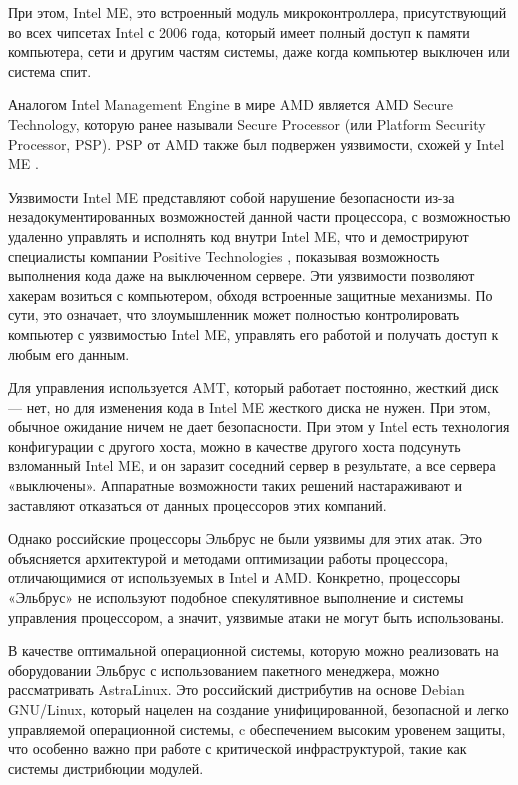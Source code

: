 При этом, Intel ME, это встроенный модуль микроконтроллера, присутствующий во всех чипсетах Intel с 2006 года, который имеет полный доступ к памяти компьютера, сети и другим частям системы, даже когда компьютер выключен или система спит.

Аналогом Intel Management Engine в мире AMD является AMD Secure Technology, которую ранее называли Secure Processor (или Platform Security Processor, PSP). PSP от AMD также был подвержен уязвимости, схожей у Intel ME \cite{risk:amdpsp}.

Уязвимости Intel ME представляют собой нарушение безопасности из-за незадокументированных возможностей данной части процессора, с возможностью удаленно управлять и исполнять код внутри Intel ME, что и демострируют специалисты компании Positive Technologies \cite{risk:intelme}, показывая возможность выполнения кода даже на выключенном сервере. Эти уязвимости позволяют хакерам возиться с компьютером, обходя встроенные защитные механизмы. По сути, это означает, что злоумышленник может полностью контролировать компьютер с уязвимостью Intel ME, управлять его работой и получать доступ к любым его данным.

Для управления используется AMT, который работает постоянно, жесткий диск — нет, но для изменения кода в  Intel ME жесткого диска не нужен. При этом, обычное ожидание ничем не дает безопасности. При этом у Intel есть технология конфигурации с другого хоста, можно в качестве другого хоста подсунуть взломанный Intel ME, и он заразит соседний сервер в результате, а все сервера «выключены». Аппаратные возможности таких решений настараживают и заставляют отказаться от данных процессоров этих компаний.

Однако российские процессоры Эльбрус не были уязвимы для этих атак. Это объясняется архитектурой и методами оптимизации работы процессора, отличающимися от используемых в Intel и AMD. Конкретно, процессоры «Эльбрус» не используют подобное спекулятивное выполнение и системы управления процессором, а значит, уязвимые атаки не могут быть использованы. \cite{risk:elbrus_no_spectre}

В качестве оптимальной операционной системы, которую можно реализовать на оборудовании Эльбрус с использованием пакетного менеджера, можно рассматривать AstraLinux. Это российский дистрибутив на основе Debian GNU/Linux, который нацелен на создание унифицированной, безопасной и легко управляемой операционной системы, c обеспечением высоким уровенем защиты, что особенно важно при работе с критической инфраструктурой, такие как системы дистрибюции модулей. \cite{dev:astra_linux}


